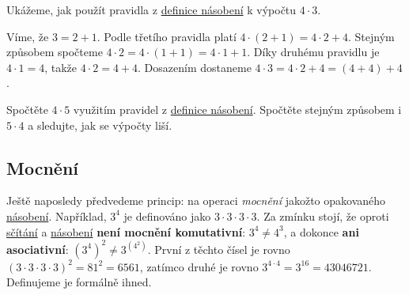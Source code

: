 \begin{example}
  Ukážeme, jak použít pravidla z \hyperref[def:nasobeni]{definice násobení} k
  výpočtu $4 \cdot 3$.

  Víme, že $3 = 2 + 1$. Podle třetího pravidla platí $4 \cdot (2 + 1) = 4 \cdot
  2 + 4$. Stejným způsobem spočteme $4 \cdot 2 = 4 \cdot (1 + 1) = 4 \cdot 1 +
  1$. Díky druhému pravidlu je $4 \cdot 1 = 4$, takže $4 \cdot 2 = 4 + 4$.
  Dosazením dostaneme $4 \cdot 3 = 4 \cdot 2 + 4 = (4 + 4) + 4$.
\end{example}

\begin{exercise}
  Spočtěte $4 \cdot 5$ využitím pravidel z \hyperref[def:nasobeni]{definice
  násobení}. Spočtěte stejným způsobem i $5 \cdot 4$ a sledujte, jak se výpočty
  liší.
\end{exercise}

\subsection{Mocnění}
\label{ssec:mocneni}

Ještě naposledy předvedeme princip:  na
operaci \emph{mocnění} jakožto opakovaného \hyperref[def:nasobeni]{násobení}.
Například, $3^{4}$ je definováno jako $3 \cdot 3 \cdot 3 \cdot 3$. Za zmínku
stojí, že oproti \hyperref[def:scitani]{sčítání} a
\hyperref[def:nasobeni]{násobení} \textbf{není mocnění komutativní}: $3^{4} \neq
4^{3}$, a dokonce \textbf{ani asociativní}: $(3^{4})^{2} \neq 3^{(4^{2})}$.
První z těchto čísel je rovno $(3 \cdot 3 \cdot 3 \cdot 3)^{2} = 81^{2} = 6561$,
zatímco druhé je rovno $3^{4 \cdot 4} = 3^{16} = 43046721$.
Definujeme je formálně ihned.

